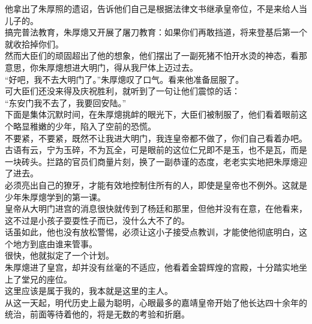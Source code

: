 \begin{multicols}{\theparacolNo}
他拿出了朱厚照的遗诏，告诉他们自己是根据法律文书继承皇帝位，不是来给人当儿子的。\\

搞完普法教育，朱厚熜又开展了屠刀教育：如果你们再敢挡道，将来登基后第一个就收拾掉你们。\\

然而大臣们的顽固超出了他的想象，他们摆出了一副死猪不怕开水烫的神态，看那意思，你朱厚熜想进大明门，得从我尸体上迈过去。\\

“好吧，我不去大明门了。”朱厚熜叹了口气。看来他准备屈服了。\\

可大臣们还没来得及庆祝胜利，就听到了一句让他们震惊的话：\\

“东安门我不去了，我要回安陆。”\\

下面是集体沉默时间，在朱厚熜挑衅的眼光下，大臣们被制服了，他们看着眼前这个略显稚嫩的少年，陷入了空前的恐慌。\\

不要紧，不要紧，既然不让我进大明门，我连皇帝都不做了，你们自己看着办吧。\\

古语有云，宁为玉碎，不为瓦全，可是眼前的这位仁兄即不是玉，也不是瓦，而是一块砖头。拦路的官员们商量片刻，换了一副恭谨的态度，老老实实地把朱厚熜迎了进去。\\

必须亮出自己的獠牙，才能有效地控制住所有的人，即使是皇帝也不例外。这就是少年朱厚熜学到的第一课。\\

皇帝从大明门进宫的消息很快就传到了杨廷和那里，但他并没有在意，在他看来，这不过是小孩子耍耍性子而已，没什么大不了的。\\

话虽如此，他也没有放松警惕，必须让这小子接受点教训，才能使他彻底明白，这个地方到底由谁来管事。\\

很快，他就拟定了一个计划。\\

朱厚熜进了皇宫，却并没有丝毫的不适应，他看着金碧辉煌的宫殿，十分踏实地坐上了堂兄的座位。\\

这里应该是属于我的，我本就是这里的主人。\\

从这一天起，明代历史上最为聪明，心眼最多的嘉靖皇帝开始了他长达四十余年的统治，前面等待着他的，将是无数的考验和折磨。\\


\end{multicols}

